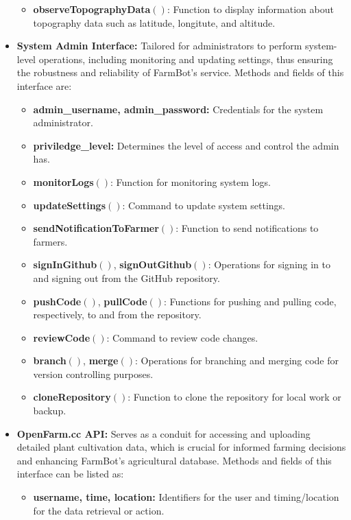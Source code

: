 \begin{itemize}
\begin{itemize}
        \item \textbf{observeTopographyData}$()$: Function to display information about topography data such as latitude, longitute, and altitude.
    \end{itemize}
    \item \textbf{System Admin Interface:} Tailored for administrators to perform system-level operations, including monitoring and updating settings, thus ensuring the robustness and reliability of FarmBot's service. Methods and fields of this interface are:
    \begin{itemize}
        \item \textbf{admin\_username, admin\_password:} Credentials for the system administrator.
        \item \textbf{priviledge\_level:} Determines the level of access and control the admin has.
        \item \textbf{monitorLogs}$()$: Function for monitoring system logs.
        \item \textbf{updateSettings}$()$: Command to update system settings.
        \item \textbf{sendNotificationToFarmer}$()$: Function to send notifications to farmers.
        \item \textbf{signInGithub}$()$, \textbf{signOutGithub}$()$: Operations for signing in to and signing out from the GitHub repository.
        \item \textbf{pushCode}$()$, \textbf{pullCode}$()$: Functions for pushing and pulling code, respectively, to and from the repository.
        \item \textbf{reviewCode}$()$: Command to review code changes.
        \item \textbf{branch}$()$, \textbf{merge}$()$: Operations for branching and merging code for version controlling purposes.
        \item \textbf{cloneRepository}$()$: Function to clone the repository for local work or backup.
    \end{itemize}
    \item \textbf{OpenFarm.cc API:} Serves as a conduit for accessing and uploading detailed plant cultivation data, which is crucial for informed farming decisions and enhancing FarmBot's agricultural database. Methods and fields of this interface can be listed as:
    \begin{itemize}
        \item \textbf{username, time, location:} Identifiers for the user and timing/location for the data retrieval or action.

\end{itemize}
\end{itemize}
